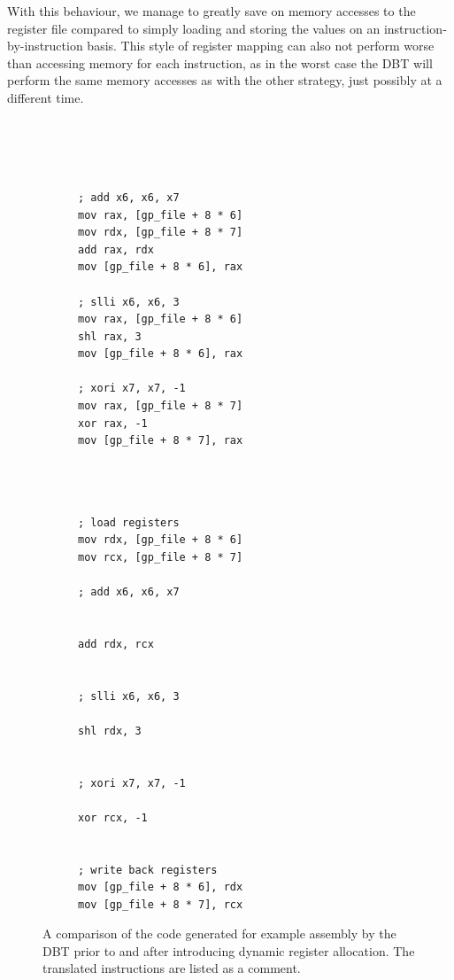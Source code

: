 With this behaviour, we manage to greatly save on memory accesses to the register file compared to simply loading and storing the values on an instruction-by-instruction basis.
This style of register mapping can also not perform worse than accessing memory for each instruction, as in the worst case the DBT will perform the same memory accesses as with the other strategy, just possibly at a different time.

\begin{figure}[h]
\begin{subfigure}{0.45\textwidth}
\begin{lstlisting}[label={lst:without-lazy-replace}, showlines=true]




; add x6, x6, x7
mov	rax, [gp_file + 8 * 6]
mov	rdx, [gp_file + 8 * 7]
add	rax, rdx
mov	[gp_file + 8 * 6], rax

; slli x6, x6, 3
mov	rax, [gp_file + 8 * 6]
shl	rax, 3
mov	[gp_file + 8 * 6], rax

; xori x7, x7, -1
mov	rax, [gp_file + 8 * 7]
xor	rax, -1
mov	[gp_file + 8 * 7], rax




\end{lstlisting}
\end{subfigure}
\hfill
\begin{subfigure}{0.45\textwidth}
\begin{lstlisting}[label={lst:with-lazy-replace}, showlines=true]
; load registers
mov rdx, [gp_file + 8 * 6]
mov rcx, [gp_file + 8 * 7]

; add x6, x6, x7


add	rdx, rcx


; slli x6, x6, 3

shl	rdx, 3


; xori x7, x7, -1

xor	rcx, -1


; write back registers
mov [gp_file + 8 * 6], rdx
mov [gp_file + 8 * 7], rcx
\end{lstlisting}
\end{subfigure}
\label{fig:lazy-replace-code}
\caption[Example assembly for dynamic register allocation]%
{A comparison of the code generated for example assembly by the DBT prior to and after introducing dynamic register allocation. The translated instructions are listed as a comment.}
\end{figure}


